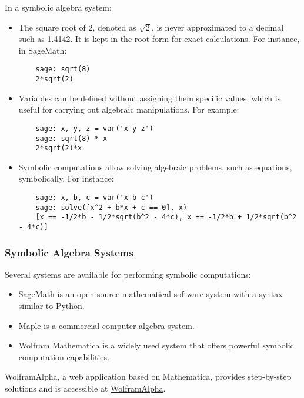 \documentclass[12pt]{article}
\begin{document}
In a symbolic algebra system:
\begin{itemize}
    \item The square root of 2, denoted as \(\sqrt{2}\), is never approximated to a decimal such as 1.4142. It is kept in the root form for exact calculations. For instance, in SageMath:
    \begin{verbatim}
    sage: sqrt(8)
    2*sqrt(2)
    \end{verbatim}

    \item Variables can be defined without assigning them specific values, which is useful for carrying out algebraic manipulations. For example:
    \begin{verbatim}
    sage: x, y, z = var('x y z')
    sage: sqrt(8) * x
    2*sqrt(2)*x
    \end{verbatim}

    \item Symbolic computations allow solving algebraic problems, such as equations, symbolically. For instance:
    \begin{verbatim}
    sage: x, b, c = var('x b c')
    sage: solve([x^2 + b*x + c == 0], x)
    [x == -1/2*b - 1/2*sqrt(b^2 - 4*c), x == -1/2*b + 1/2*sqrt(b^2 - 4*c)]
    \end{verbatim}
\end{itemize}

\subsubsection{Symbolic Algebra Systems}
Several systems are available for performing symbolic computations:

\begin{itemize}
    \item SageMath is an open-source mathematical software system with a syntax similar to Python.
    \item Maple is a commercial computer algebra system.
    \item Wolfram Mathematica is a widely used system that offers powerful symbolic computation capabilities.
\end{itemize}

WolframAlpha, a web application based on Mathematica, provides step-by-step solutions and is accessible at \href{http://www.wolframalpha.com}{WolframAlpha}.
\end{document}
